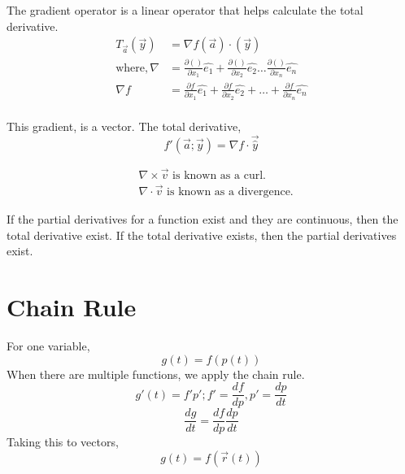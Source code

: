 \documentclass[twoside]{report}
\begin{document}
\begin{definition}
   The gradient operator is a linear operator that helps calculate the total derivative.
\begin{align*}
   T_{\vec{a}}(\vec{y}) &= \nabla f(\vec{a}) \cdot (\vec{y}) \\
   \text{where}, \nabla &= \frac{\partial ()}{\partial x_1} \hat{e_1} + \frac{\partial ()}{\partial x_2} \hat{e_2} \dots \frac{\partial ()}{\partial x_n} \hat{e_n} \\
   \nabla f &= \frac{\partial f}{\partial x_1}\hat{e_1} + \frac{\partial f}{\partial x_2} \hat{e_2} + \dots + \frac{\partial f}{\partial x_n} \hat{e_n} \\
\end{align*}
\end{definition}
This gradient, is a vector.
The total derivative, 
\[
   f'(\vec{a};\vec{y}) = \nabla f \cdot \vec{\hat{y}}
\]
\begin{note}
   \begin{align*}
      &\nabla \times \vec{v} \text{ is known as a curl.}\\
      &\nabla \cdot \vec{v} \text{ is known as a divergence.}
   \end{align*}
\end{note}
If the partial derivatives for a function exist and they are continuous, then the total derivative exist. If the total derivative exists, then the partial derivatives exist.

\section{Chain Rule}
For one variable, 
\[
	g(t) = f(p(t))
\]
When there are multiple functions, we apply the chain rule.
\[
   g'(t) = f' p' ; f' = \frac{df}{dp}, p' = \frac{dp}{dt}
\]
\[
   \frac{dg}{dt} = \frac{df}{dp} \frac{dp}{dt}
\]
Taking this to vectors,
\[
   g(t) = f(\vec{r}(t))
\]
\end{document}
